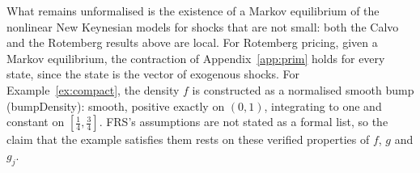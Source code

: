 \documentclass[11pt]{article}
\theoremstyle{definition}
\theoremstyle{remark}
\newcommand{\leanunderscore}{\char`\_\hskip 0pt plus 0.4pt\relax}
\newcommand{\lean}[1]{\begingroup\ttfamily\small\let\_\leanunderscore #1\endgroup}
\begin{document}
\noindent What remains unformalised is the existence of a Markov equilibrium of the nonlinear New
Keynesian models for shocks that are not small: both the Calvo and the Rotemberg results above are
local. For Rotemberg pricing, given a Markov equilibrium, the contraction of
Appendix~\ref{app:prim} holds for every state, since the state is the vector of exogenous shocks.
For Example~\ref{ex:compact}, the density $f$ is
constructed as a normalised smooth bump (\lean{bumpDensity}): smooth, positive exactly on
$(0,1)$, integrating to one and constant on $[\frac14, \frac34]$. FRS's assumptions are not stated
as a formal list, so the claim that the example satisfies them rests on these verified
properties of $f$, $g$ and $g_j$.
\end{document}
